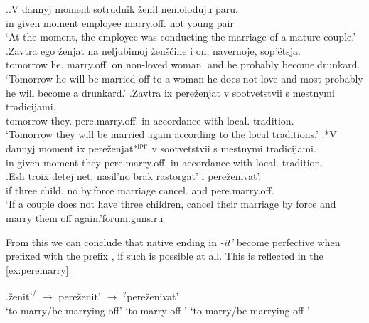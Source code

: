 \ex.\ag.\label{ex:peremarry1}V dannyj moment sotrudnik \v{z}enil\textsuperscript{\IPF} nemoloduju paru.\\
in given moment employee marry.off. {not young} pair\\
\trans `At the moment, the employee was conducting the marriage of a mature couple.'
\bg.\label{ex:peremarry2}Zavtra ego \v{z}enjat\textsuperscript{\PF} na neljubimoj \v{z}en\v{s}\v{c}ine i on, navernoje, sop'\"{e}tsja.\\
tomorrow he. marry.off. on non-loved woman. and he probably {become.drunkard.}\\
\trans `Tomorrow he will be married off to a woman he does not love and most probably he will become a drunkard.'
\bg.\label{ex:peremarry3}Zavtra ix pere\v{z}enjat\textsuperscript{\PF} v sootvetstvii s mestnymi tradicijami.\\
tomorrow they. pere.marry.off. in accordance with local. tradition.\\
\trans `Tomorrow they will be married again according to the local traditions.'
\bg.*V dannyj moment ix pere\v{z}enjat$^{*{\textsc{ipf}}}$ v sootvetstvii s mestnymi tradicijami.\label{ex:peremarry4}\\
in given moment they pere.marry.off. in accordance with local. tradition.\\

\exg.\label{ex:perezenivat'}Esli troix detej net, nasil'no brak rastorgat' i pere\v{z}enivat'.\\
if three child. no by.force marriage cancel. and pere.marry.off.\\
\trans `If a couple does not have three children, cancel their marriage by force and marry them off again.'\hbox{}\hfill\hbox{\url{forum.guns.ru}}

From this we can conclude that native  ending in \textit{-it'} become perfective when prefixed with the  prefix , if such  is possible at all. This is reflected in the  \ref{ex:peremarry}.

\exg.\label{ex:peremarry}\v{z}enit'\textsuperscript{\IPF\slash\PF} $\rightarrow$ pere\v{z}enit'\textsuperscript{\PF} $\rightarrow$ $^?$pere\v{z}enivat'\textsuperscript{\IPF} \\
{`to marry/be marrying off'} {} {`to marry off '} {} {`to marry/be marrying off '}\\

